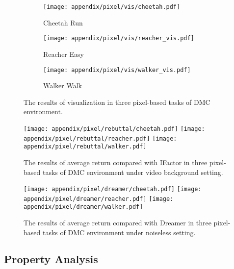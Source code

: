\begin{figure}[h]
    \centering
    \begin{subfigure}{0.49\linewidth}
\texttt{[image: appendix/pixel/vis/cheetah.pdf]}
\caption{Cheetah Run}
\end{subfigure}
\hfill
\begin{subfigure}{0.49\linewidth}
\texttt{[image: appendix/pixel/vis/reacher\_vis.pdf]}
\caption{Reacher Easy}
\end{subfigure}
\hfill
\begin{subfigure}{0.5\linewidth}
\texttt{[image: appendix/pixel/vis/walker\_vis.pdf]}
\caption{Walker Walk}
\end{subfigure}
\hfill
   \caption{The results of visualization in three pixel-based tasks of DMC environment.}
\label{fig:pixel_dmc}
\end{figure}

\begin{figure}[h]
    \centering
    \texttt{[image: appendix/pixel/rebuttal/cheetah.pdf]}
    \texttt{[image: appendix/pixel/rebuttal/reacher.pdf]}
    \texttt{[image: appendix/pixel/rebuttal/walker.pdf]}
   \caption{The results of average return compared with IFactor in three pixel-based tasks of DMC environment under video background setting.}
\label{fig:vis_dmc}
\end{figure}

\begin{figure}[H]
    \centering
    \texttt{[image: appendix/pixel/dreamer/cheetah.pdf]}
    \texttt{[image: appendix/pixel/dreamer/reacher.pdf]}
    \texttt{[image: appendix/pixel/dreamer/walker.pdf]}
   \caption{The results of average return compared with Dreamer in three pixel-based tasks of DMC environment under noiseless setting.}
\label{fig:vis_dmc_dreamer}
\end{figure}



\subsection{Property Analysis}
\label{Property analysis}

